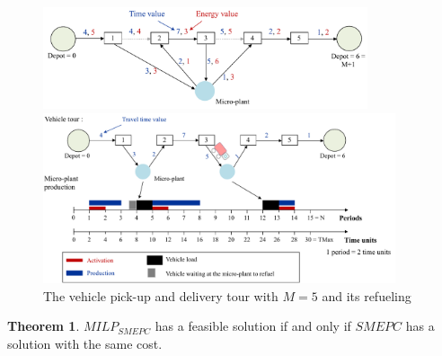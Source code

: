 \documentclass[11pt]{article}
\theoremstyle{plain}%
\theoremstyle{definition} \newtheorem{lem}{Lemma}[section]
\theoremstyle{definition} \newtheorem{claim}{Claim}[lem]
\theoremstyle{definition} \newtheorem{theorem}{Theorem}[section]
\theoremstyle{definition} \newtheorem{exo}{Exercice n$^\circ$}
\theoremstyle{definition} \newtheorem{quest}{}[exo]
\theoremstyle{definition} \newtheorem{sousquest}{}[quest]
\theoremstyle{remark}
\theoremstyle{definition}
\begin{document}
\begin{figure}[H]
	\centerline{
		\includegraphics[height=30mm]{EN_Trip.pdf}}
		\centerline{
		\includegraphics[height=50mm]{EN_synchronisation.pdf}}
	\caption[]{The vehicle pick-up and delivery tour with $M=5$ and its refueling }
	\label{Trip_exple}
\end{figure}
\begin{theorem}
$MILP_{SMEPC}$ has a feasible solution if and only if $SMEPC$ has a solution with the same cost.
\end{theorem}
\end{document}
